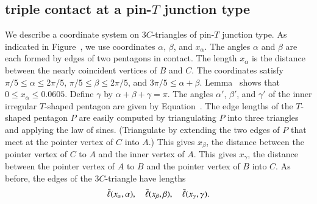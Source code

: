 \subsection{triple contact at a pin-$T$ junction type} We describe a coordinate system on
$3C$-triangles of pin-$T$ junction type.  As indicated in
Figure~, we use coordinates $\alpha$, $\beta$, and
$x_\alpha$.  The angles $\alpha$ and $\beta$ are each formed by edges
of two pentagons in contact.  The length $x_\alpha$ is the distance
between the nearly coincident vertices of $B$ and $C$.
The coordinates satisfy $\pi/5 \le \alpha \le 2\pi/5$, $\pi/5\le
\beta \le 2\pi/5$, and $3\pi/5 \le \alpha+\beta$.
Lemma~ shows that $0\le x_\alpha\le 0.0605$.  Define
$\gamma$ by $\alpha+\beta+\gamma = \pi$.  The angles $\alpha'$,
$\beta'$, and $\gamma'$ of the inner irregular $T$-shaped pentagon are
given by Equation~.  The edge lengths of the $T$-shaped
pentagon $P$ are easily computed by triangulating $P$ into three
triangles and applying the law of sines.  (Triangulate by extending
the two edges of $P$ that meet at the pointer vertex of $C$ into $A$.)
This gives $x_\beta$, the distance between the pointer vertex of $C$
to $A$ and the inner vertex of $A$.  This gives $x_\gamma$, the
distance between the pointer vertex of $A$ to $B$ and the pointer
vertex of $B$ into $C$.  As before, the edges of the $3C$-triangle
have lengths
\[
\bar\ell(x_\alpha,\alpha),\quad \bar\ell(x_\beta,\beta),\quad \bar\ell(x_\gamma,\gamma).
\]




